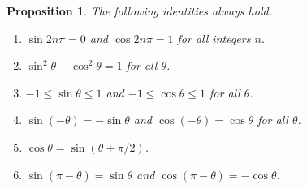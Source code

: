 \documentclass[a4paper,leqno]{article}
\numberwithin{equation}{section}
\newtheorem{prp}[equation]{Proposition}
\theoremstyle{definition}
\theoremstyle{remark}
\begin{document}
\begin{prp}\label{thm:basicids}
  The following identities always hold.
  \begin{enumerate}
    \item $ \sin 2n\pi = 0 $ and $ \cos 2n\pi = 1 $ for all integers $ n $.
    \item $ \sin^2 \theta + \cos^2 \theta = 1 $ for all $ \theta $.
    \item $ -1 \leq \sin \theta \leq 1 $ and $ -1 \leq \cos \theta \leq 1 $ for all $ \theta $.
    \item $ \sin (-\theta) = -\sin \theta $ and $ \cos (-\theta) = \cos \theta $ for all $ \theta $.
    \item $ \cos \theta = \sin (\theta + \pi/2) $.
    \item $ \sin (\pi - \theta) = \sin \theta $ and $ \cos(\pi - \theta) = -\cos \theta $.
  \end{enumerate}
\end{prp}
\end{document}
